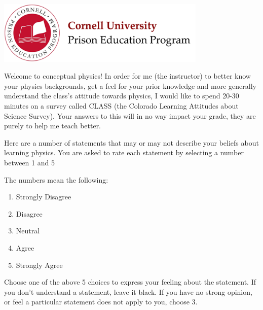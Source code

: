 \documentclass[addpoints,12pt]{exam}
\begin{document}

\begin{flushright}
\vspace{0.2in}

\end{flushright}

\begin{center}
\includegraphics[width=10cm]{../images/logo.png}
\end{center}

\begin{center}
\end{center}

Welcome to conceptual physics! In order for me (the instructor) to better know your physics backgrounds, get a feel for your prior knowledge and more generally understand the class's attitude towards physics, I would like to spend 20-30 minutes on a survey called CLASS (the Colorado Learning Attitudes about Science Survey). Your answers to this will in no way impact your grade, they are purely to help me teach better.

Here are a number of statements that may or may not describe your beliefs about learning physics. You are asked to rate each statement by selecting a number between 1 and 5
\begin{center}\end{center}

The numbers mean the following:
\begin{enumerate}
\item Strongly Disagree
\item Disagree
\item Neutral
\item Agree
\item Strongly Agree
\end{enumerate}

Choose one of the above 5 choices to express your feeling about the statement. If you don't understand a statement, leave it black. If you have no strong opinion, or feel  a particular statement does not apply to you, choose 3.
\end{document}
